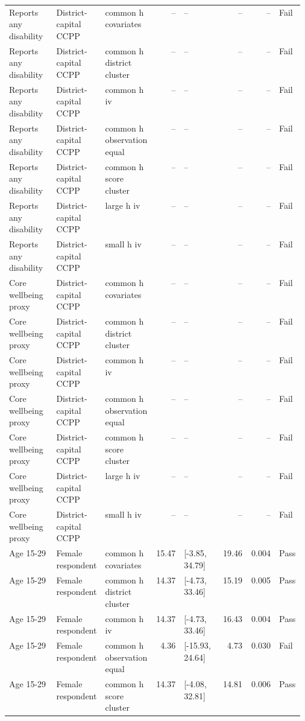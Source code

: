 \begin{longtable}{@{}p{0.16\linewidth}p{0.14\linewidth}p{0.14\linewidth}rp{0.13\linewidth}rrl@{}}
Reports any disability & District-capital CCPP & common h covariates & -- & -- & -- & -- & Fail \\
Reports any disability & District-capital CCPP & common h district cluster & -- & -- & -- & -- & Fail \\
Reports any disability & District-capital CCPP & common h iv & -- & -- & -- & -- & Fail \\
Reports any disability & District-capital CCPP & common h observation equal & -- & -- & -- & -- & Fail \\
Reports any disability & District-capital CCPP & common h score cluster & -- & -- & -- & -- & Fail \\
Reports any disability & District-capital CCPP & large h iv & -- & -- & -- & -- & Fail \\
Reports any disability & District-capital CCPP & small h iv & -- & -- & -- & -- & Fail \\
Core wellbeing proxy & District-capital CCPP & common h covariates & -- & -- & -- & -- & Fail \\
Core wellbeing proxy & District-capital CCPP & common h district cluster & -- & -- & -- & -- & Fail \\
Core wellbeing proxy & District-capital CCPP & common h iv & -- & -- & -- & -- & Fail \\
Core wellbeing proxy & District-capital CCPP & common h observation equal & -- & -- & -- & -- & Fail \\
Core wellbeing proxy & District-capital CCPP & common h score cluster & -- & -- & -- & -- & Fail \\
Core wellbeing proxy & District-capital CCPP & large h iv & -- & -- & -- & -- & Fail \\
Core wellbeing proxy & District-capital CCPP & small h iv & -- & -- & -- & -- & Fail \\
Age 15-29 & Female respondent & common h covariates & 15.47 & [-3.85, 34.79] & 19.46 & 0.004 & Pass \\
Age 15-29 & Female respondent & common h district cluster & 14.37 & [-4.73, 33.46] & 15.19 & 0.005 & Pass \\
Age 15-29 & Female respondent & common h iv & 14.37 & [-4.73, 33.46] & 16.43 & 0.004 & Pass \\
Age 15-29 & Female respondent & common h observation equal & 4.36 & [-15.93, 24.64] & 4.73 & 0.030 & Fail \\
Age 15-29 & Female respondent & common h score cluster & 14.37 & [-4.08, 32.81] & 14.81 & 0.006 & Pass \\

\end{longtable}
